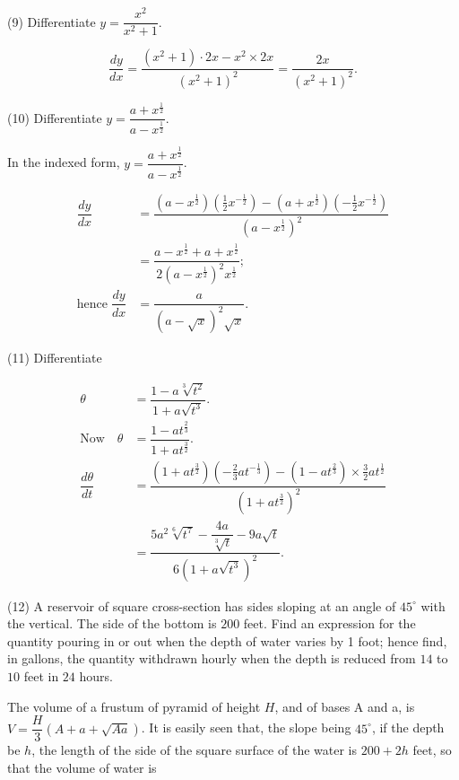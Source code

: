 \documentclass{ximera}
\begin{document}
\par\noindent
(9) Differentiate $y=\dfrac{x^2}{x^2+1}$.

$$
\dfrac{dy}{dx}=\dfrac{(x^2+1)\cdot 2x−x^2\times 2x}{(x^2+1)^2}=\dfrac{2x}{(x^2+1)^2}.
$$

\par\noindent
(10) Differentiate $y=\dfrac{ a+x^{\frac{1}{2}} }{ a−x^{\frac{1}{2}} }$.


In the indexed form, $y=\dfrac{ a+x^{\frac{1}{2}} }{ a−x^{\frac{1}{2}} }$.

\begin{align*}
\dfrac{dy}{dx} &=\dfrac{ (a−x^{\frac{1}{2}})(\frac{1}{2}x^{−\frac{1}{2}})−(a+x^{\frac{1}{2}})(−\frac{1}{2}x^{−\frac{1}{2}}) }{ (a−x^{\frac{1}{2}})^2 }\\
               &=\dfrac{ a−x^{\frac{1}{2}}+a+x^{\frac{1}{2}} }{ 2(a−x^{\frac{1}{2}})^2x^{\frac{1}{2}} };\\
\text{hence}\; \dfrac{dy}{dx} &=\dfrac{a}{ (a−\sqrt{x})^2\sqrt{x} }.
\end{align*}

\par\noindent
(11) Differentiate

\begin{align*}
\theta &=\dfrac{1-a\sqrt[3]{t^2}}{1+a\sqrt{t^3}}.\\
\text{Now}\quad \theta &=\dfrac{ 1−at^{\frac{2}{3}} }{ 1+at^{\frac{3}{2}} }.\\
\dfrac{d\theta}{dt} &=\dfrac{ (1+at^{\frac{3}{2}})(−\frac{2}{3}at^{−\frac{1}{3}})−(1−at^{\frac{2}{3}})\times\frac{3}{2}at^{\frac{1}{2}} }{ (1+at^{\frac{3}{2}})^2 }\\
                    &=\dfrac{5a^2\sqrt[6]{t^7}−\dfrac{4a}{\sqrt[3]{t}}−9a\sqrt{t}}{6(1+a\sqrt{t^3})^2}.
\end{align*}

\par\noindent
(12) A reservoir of square cross-section has sides sloping at an angle of $45^{\circ}$
with the vertical. The side of the bottom is $200$ feet. Find an expression for the quantity pouring in or out when 
the depth of water varies by 1 foot; hence find, in gallons, the quantity withdrawn hourly when the depth is reduced 
from $14$ to $10$ feet in $24$ hours.

The volume of a frustum of pyramid of height $H$, and of bases A and a, is $V=\dfrac{H}{3}(A+a+\sqrt{Aa})$. It is easily seen that, the slope being $45^{\circ}$, 
if the depth be $h$, the length of the side of the square surface of the water is $200+2h$ feet, so that the volume 
of water is
\end{document}
